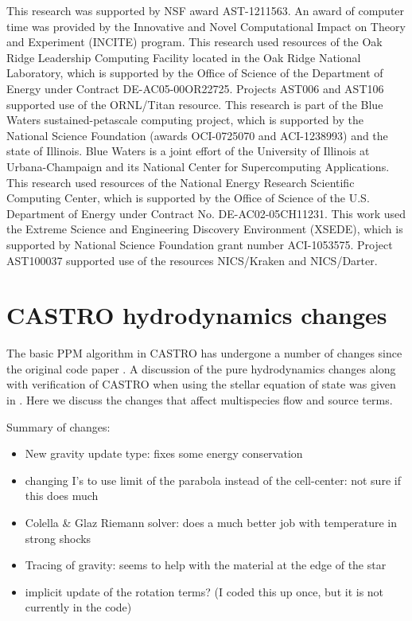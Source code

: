 \documentclass[iop]{emulateapj}
\begin{document}
This research was supported by NSF award AST-1211563. An
award of computer time was provided by the Innovative and Novel
Computational Impact on Theory and Experiment (INCITE) program.  This
research used resources of the Oak Ridge Leadership Computing Facility
located in the Oak Ridge National Laboratory, which is supported by
the Office of Science of the Department of Energy under Contract
DE-AC05-00OR22725. Projects AST006 and AST106 supported use of the ORNL/Titan resource. 
This research is part of the Blue Waters sustained-petascale computing project, 
which is supported by the National Science Foundation (awards OCI-0725070 
and ACI-1238993) and the state of Illinois. Blue Waters is a joint 
effort of the University of Illinois at Urbana-Champaign and its 
National Center for Supercomputing Applications.
This research used resources of the National Energy Research Scientific Computing
Center, which is supported by the Office of Science of the
U.S. Department of Energy under Contract No. DE-AC02-05CH11231.  
This work used the Extreme Science and Engineering Discovery Environment (XSEDE), 
which is supported by National Science Foundation grant number ACI-1053575. 
Project AST100037 supported use of the resources NICS/Kraken and NICS/Darter.

\clearpage





\clearpage
\appendix

\section{CASTRO hydrodynamics changes}

The basic PPM algorithm in CASTRO has undergone a number of changes
since the original code paper \citep{castro}.  A discussion of the
pure hydrodynamics changes along with verification of CASTRO when
using the stellar equation of state was given in
\citet{zingalekatz:2015}.  Here we discuss the changes that affect
multispecies flow and source terms.

Summary of changes:
\begin{itemize}
\item New gravity update type: fixes some energy conservation

\item changing I's to use limit of the parabola instead of the
  cell-center: not sure if this does much

\item Colella \& Glaz Riemann solver: does a much better job with
  temperature in strong shocks

\item Tracing of gravity: seems to help with the material at the edge
  of the star

\item implicit update of the rotation terms?  (I coded this up once, but
  it is not currently in the code)
\end{itemize}
\end{document}
